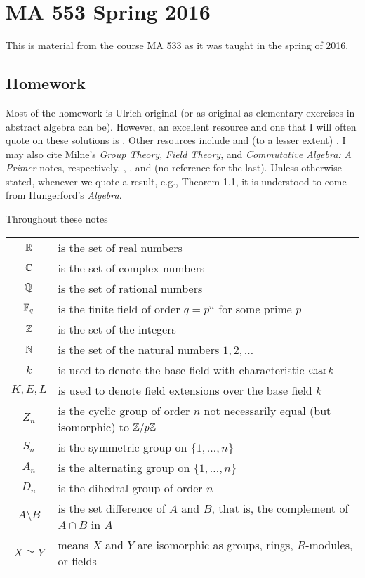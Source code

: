 \section{MA 553 Spring 2016}
This is material from the course MA 533 as it was taught in the spring of
2016.%
\bigskip
\subsection{Homework}
Most of the homework is Ulrich original (or as original as elementary
exercises in abstract algebra can be). However, an excellent resource and
one that I will often quote on these solutions is \cite{hungerford}. Other
resources include \cite{dummit-foote} and (to a lesser extent)
\cite{herstein}. I may also cite Milne's \emph{Group Theory}, \emph{Field
  Theory}, and \emph{Commutative Algebra: A Primer} notes, respectively,
\cite{milneGT}, \cite{milneFT}, and (no reference for the last). Unless
otherwise stated, whenever we quote a result, e.g., Theorem 1.1, it is
understood to come from Hungerford's \emph{Algebra}.

Throughout these notes

\begin{tabular}{cl}
  $\mathbb{R}$   & is the set of real numbers\\
  $\mathbb{C}$   & is the set of complex numbers\\
  $\mathbb{Q}$   & is the set of rational numbers\\
  $\mathbb{F}_q$ & is the finite field of order $q=p^n$ for some prime $p$\\
  $\mathbb{Z}$   & is the set of the integers\\
  $\mathbb{N}$   & is the set of the natural numbers $1,2,\dotsc$\\
  $k$   & is used to denote the base field with
             characteristic $\operatorname{char} k$\\
  $K,E,L$& is used to denote field extensions over the base field
                    $k$\\
  $Z_n$    & is the cyclic group of order $n$ not necessarily equal
             (but isomorphic) to $\mathbb{Z}/p\mathbb{Z}$\\
  $S_n$    & is the symmetric group on $\{1,\dotsc,n\}$\\
  $A_n$    & is the alternating group on $\{1,\dotsc,n\}$\\
  $D_n$    & is the dihedral group of order $n$\\
  $A\setminus B$ & is the set difference of $A$ and $B$, that is, the
                        complement of $A\cap B$ in $A$\\
  $X\cong Y$ & means $X$ and $Y$ are isomorphic as groups, rings,
                $R$-modules, or fields
\end{tabular}

